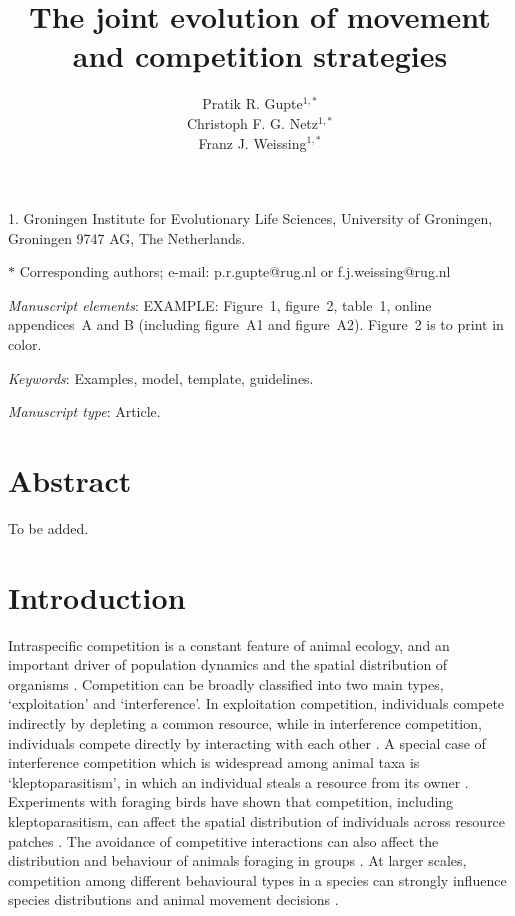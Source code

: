 \documentclass[11pt]{article}
\title{The joint evolution of movement and competition strategies}
\author{Pratik R. Gupte$^{1,\ast}$ \\ 
        Christoph F. G. Netz$^{1,\ast}$ \\ 
        Franz J. Weissing$^{1, \ast}$}
\date{}
\begin{document}
\maketitle

\noindent{} 1. Groningen Institute for Evolutionary Life Sciences, University of Groningen, Groningen 9747 AG, The Netherlands.

\noindent{} $\ast$ Corresponding authors; e-mail: p.r.gupte@rug.nl or f.j.weissing@rug.nl

\bigskip

\textit{Manuscript elements}: EXAMPLE: Figure~1, figure~2, table~1, online appendices~A and B (including figure~A1 and figure~A2). Figure~2 is to print in color.

\bigskip

\textit{Keywords}: Examples, model, template, guidelines.

\bigskip

\textit{Manuscript type}: Article. %

\bigskip


\linenumbers{}
\modulolinenumbers[1]

\newpage{}

\section{Abstract}

To be added.

\section{Introduction}

Intraspecific competition is a constant feature of animal ecology, and an important driver of population dynamics and the spatial distribution of organisms \citep{krebs1978}.
Competition can be broadly classified into two main types, `exploitation' and `interference'.
In exploitation competition, individuals compete indirectly by depleting a common resource, while in interference competition, individuals compete directly by interacting with each other \citep{birch1957,case1974,keddy2001}.
A special case of interference competition which is widespread among animal taxa is `kleptoparasitism', in which an individual steals a resource from its owner \citep{iyengar2008}.
Experiments with foraging birds have shown that competition, including kleptoparasitism, can affect the spatial distribution of individuals across resource patches \citep{goss-custard1980,vahl2005,vahl2005a,vahl2007,rutten2010}.
The avoidance of competitive interactions can also affect the distribution and behaviour of animals foraging in groups \citep{bijleveld2012,rutten2010a}.
At larger scales, competition among different behavioural types in a species can strongly influence species distributions and animal movement decisions \citep[e.g.][]{duckworth2007,schlagel2020}.
\end{document}
